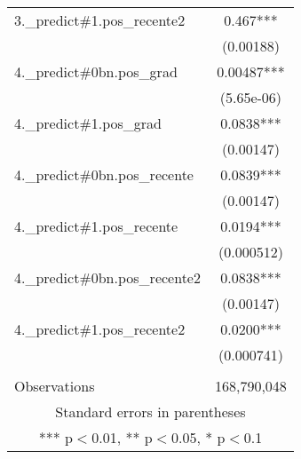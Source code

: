 \documentclass[]{article}
\begin{document}
\begin{tabular}{lc}
3.\_predict\#1.pos\_recente2 & 0.467*** \\
 & (0.00188) \\
4.\_predict\#0bn.pos\_grad & 0.00487*** \\
 & (5.65e-06) \\
4.\_predict\#1.pos\_grad & 0.0838*** \\
 & (0.00147) \\
4.\_predict\#0bn.pos\_recente & 0.0839*** \\
 & (0.00147) \\
4.\_predict\#1.pos\_recente & 0.0194*** \\
 & (0.000512) \\
4.\_predict\#0bn.pos\_recente2 & 0.0838*** \\
 & (0.00147) \\
4.\_predict\#1.pos\_recente2 & 0.0200*** \\
 & (0.000741) \\
 &  \\
 Observations & 168,790,048 \\ \hline
\multicolumn{2}{c}{ Standard errors in parentheses} \\
\multicolumn{2}{c}{ *** p$<$0.01, ** p$<$0.05, * p$<$0.1} \\
\end{tabular}
\end{document}

